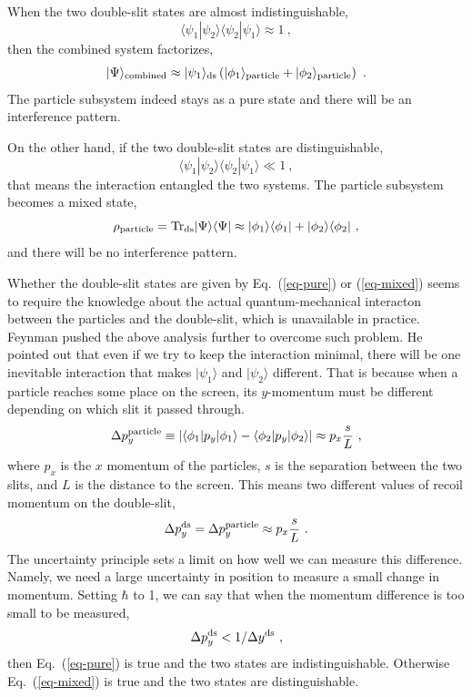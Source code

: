 \documentclass[aps,showpacs,onecolumn,floats,prd,superscriptaddress,nofootinbib]{revtex4-1}
\begin{document}
When the two double-slit states are almost indistinguishable,
\begin{equation}
\langle\psi_1|\psi_2\rangle\langle\psi_2|\psi_1\rangle \approx 1~,
\label{eq-pure}
\end{equation}
then the combined system factorizes,
\begin{equation}
|\Psi\rangle_{\rm combined} \approx |\psi_1\rangle_{\rm ds}
\left(|\phi_1\rangle_{\rm particle} + |\phi_2\rangle_{\rm particle}\right) ~.
\end{equation}
The particle subsystem indeed stays as a pure state and there will be an interference pattern.

On the other hand, if the two double-slit states are distinguishable,
\begin{equation}
\langle\psi_1|\psi_2\rangle\langle\psi_2|\psi_1\rangle \ll 1~,
\label{eq-mixed}
\end{equation}
that means the interaction entangled the two systems. The particle subsystem becomes a mixed state,
\begin{equation}
\rho_{\rm particle} = {\rm Tr}_{\rm ds}|\Psi\rangle\langle\Psi| \approx
|\phi_1\rangle\langle\phi_1| + |\phi_2\rangle\langle\phi_2|~,
\end{equation}
and there will be no interference pattern.

Whether the double-slit states are given by Eq.~(\ref{eq-pure}) or (\ref{eq-mixed}) seems to require the knowledge about the actual quantum-mechanical interacton between the particles and the double-slit, which is unavailable in practice.
Feynman pushed the above analysis further to overcome such problem.
He pointed out that even if we try to keep the interaction minimal, there will be one inevitable interaction that makes $|\psi_1\rangle$ and $|\psi_2\rangle$ different.
That is because when a particle reaches some place on the screen, its $y$-momentum must be different depending on which slit it passed through.
\begin{equation}
\Delta p_y^{\rm particle} \equiv 
|\langle\phi_1|p_y|\phi_1\rangle - \langle\phi_2|p_y|\phi_2\rangle| 
\approx p_x \frac{s}{L}~,
\end{equation}
where $p_x$ is the $x$ momentum of the particles, $s$ is the separation between the two slits, and $L$ is the distance to the screen. 
This means two different values of recoil momentum on the double-slit,
\begin{equation}
\Delta p_y^{\rm ds} = \Delta p_y^{\rm particle} \approx p_x \frac{s}{L}~.
\label{eq-dpds}
\end{equation}
The uncertainty principle sets a limit on how well we can measure this difference. 
Namely, we need a large uncertainty in position to measure a small change in momentum. 
Setting $\hbar$ to 1, we can say that when the momentum difference is too small to be measured,
\begin{equation}
\Delta p_y^{\rm ds} < 1/\Delta y^{\rm ds}~,
\label{eq-standard}
\end{equation} 
then Eq.~(\ref{eq-pure}) is true and the two states are indistinguishable. 
Otherwise Eq.~(\ref{eq-mixed}) is true and the two states are distinguishable.
\end{document}
